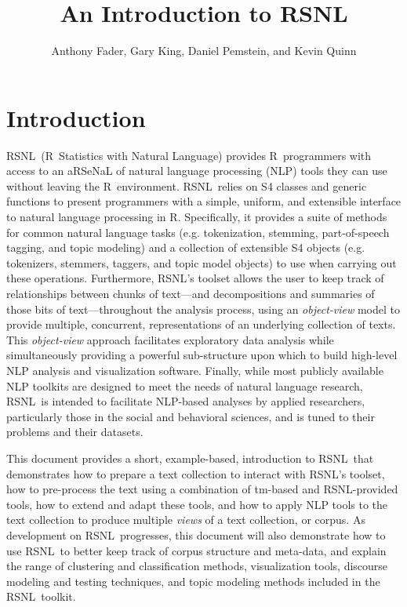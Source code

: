 \documentclass[11pt]{article}
\def\R{\textsf{R}}
\def\RSNL{{\normalfont\fontseries{b}\selectfont RSNL}}
\def\tm{{\normalfont\fontseries{b}\selectfont tm}}
\begin{document}
\title{An Introduction to \RSNL}

\author{Anthony Fader, Gary King, Daniel Pemstein, and Kevin Quinn}

\maketitle

\section{Introduction}




\RSNL\ (\R\ Statistics with Natural Language) provides \R\ programmers
with access to an aRSeNaL of natural language processing (NLP) tools
they can use without leaving the \R\ environment.  \RSNL\ relies on S4
classes and generic functions to present programmers with a simple,
uniform, and extensible interface to natural language processing in
\R.  Specifically, it provides a suite of methods for common natural
language tasks (e.g. tokenization, stemming, part-of-speech tagging,
and topic modeling) and a collection of extensible S4 objects (e.g.
tokenizers, stemmers, taggers, and topic model objects) to use when
carrying out these operations.  Furthermore, \RSNL's toolset allows
the user to keep track of relationships between chunks of text---and
decompositions and summaries of those bits of text---throughout the
analysis process, using an \emph{object-view} model to provide
multiple, concurrent, representations of an underlying collection of
texts.  This \emph{object-view} approach facilitates exploratory data
analysis while simultaneously providing a powerful sub-structure upon
which to build high-level NLP analysis and visualization software.
Finally, while most publicly available NLP toolkits are designed to
meet the needs of natural language research, \RSNL\ is intended to
facilitate NLP-based analyses by applied researchers, particularly
those in the social and behavioral sciences, and is tuned to their
problems and their datasets.

This document provides a short, example-based, introduction to \RSNL\
that demonstrates how to prepare a text collection to
interact with \RSNL's toolset, how to pre-process the text using a
combination of \tm-based and \RSNL-provided tools, how to extend and
adapt these tools, and how to apply NLP tools to the text collection
to produce multiple \emph{views} of a text collection, or corpus.  As
development on \RSNL\ progresses, this document will also demonstrate
how to use \RSNL\ to better keep track of corpus structure and
meta-data, and explain the range of clustering and classification
methods, visualization tools, discourse modeling and testing
techniques, and topic modeling methods included in the \RSNL\ toolkit.
\end{document}
